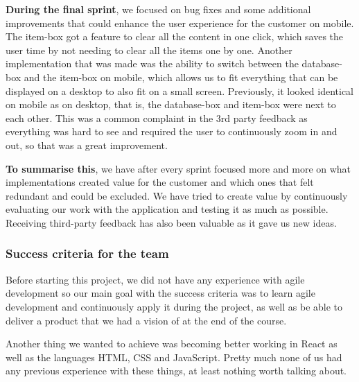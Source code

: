 \textbf{During the final sprint}, we focused on bug fixes and some additional improvements that could enhance the user experience for the customer on mobile. The item-box got a feature to clear all the content in one click, which saves the user time by not needing to clear all the items one by one. Another implementation that was made was the ability to switch between the database-box and the item-box on mobile, which allows us to fit everything that can be displayed on a desktop to also fit on a small screen. Previously, it looked identical on mobile as on desktop, that is, the database-box and item-box were next to each other. This was a common complaint in the 3rd party feedback as everything was hard to see and required the user to continuously zoom in and out, so that was a great improvement. 

\textbf{To summarise this}, we have after every sprint focused more and more on what implementations created value for the customer and which ones that felt redundant and could be excluded. We have tried to create value by continuously evaluating our work with the application and testing it as much as possible. Receiving third-party feedback has also been valuable as it gave us new ideas. 

\subsubsection{Success criteria for the team}
Before starting this project, we did not have any experience with agile development so our main goal with the success criteria was to learn agile development and continuously apply it during the project, as well as be able to deliver a product that we had a vision of at the end of the course.  

Another thing we wanted to achieve was becoming better working in React\cite{React} as well as the languages HTML\cite{HTML}, CSS\cite{CSS} and JavaScript\cite{JavaScript}. Pretty much none of us had any previous experience with these things, at least nothing worth talking about.

